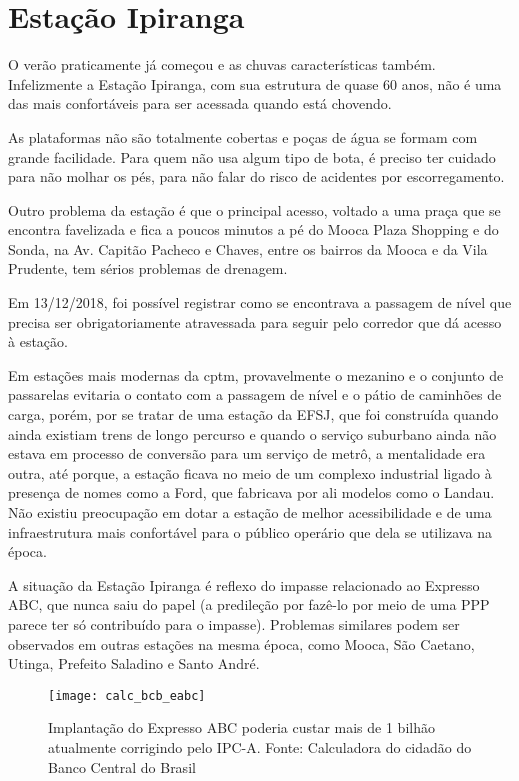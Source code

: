 \documentclass[11pt,fleqn]{book} %
\begin{document}
\section{Estação Ipiranga}\label{s:ipg}


O verão praticamente já começou e as chuvas características também. Infelizmente a Estação Ipiranga, com sua estrutura de quase 60 anos, não é uma das mais confortáveis para ser acessada quando está chovendo.

As plataformas não são totalmente cobertas e poças de água se formam com grande facilidade. Para quem não usa algum tipo de bota, é preciso ter cuidado para não molhar os pés, para não falar do risco de acidentes por escorregamento.

Outro problema da estação é que o principal acesso, voltado a uma praça que se encontra favelizada e fica a poucos minutos a pé do Mooca Plaza Shopping e do Sonda, na Av. Capitão Pacheco e Chaves, entre os bairros da Mooca e da Vila Prudente, tem sérios problemas de drenagem.

Em 13/12/2018, foi possível registrar como se encontrava a passagem de nível que precisa ser obrigatoriamente atravessada para seguir pelo corredor que dá acesso à estação.

Em estações mais modernas da \gls{cptm}, provavelmente o mezanino e o conjunto de passarelas evitaria o contato com a passagem de nível e o pátio de caminhões de carga, porém, por se tratar de uma estação da EFSJ, que foi construída quando ainda existiam trens de longo percurso e quando o serviço suburbano ainda não estava em processo de conversão para um serviço de metrô, a mentalidade era outra, até porque, a estação ficava no meio de um complexo industrial ligado à presença de nomes como a Ford, que fabricava por ali modelos como o Landau. Não existiu preocupação em dotar a estação de melhor acessibilidade e de uma infraestrutura mais confortável para o público operário que dela se utilizava na época.

A situação da Estação Ipiranga é reflexo do impasse relacionado ao Expresso ABC, que nunca saiu do papel (a predileção por fazê-lo por meio de uma PPP parece ter só contribuído para o impasse). Problemas similares podem ser observados em outras estações na mesma época, como Mooca, São Caetano, Utinga, Prefeito Saladino e Santo André.

\begin{figure}[htb]
	\caption[Valor corrigido do Expresso ABC]{Implantação do Expresso ABC poderia custar mais de 1 bilhão atualmente corrigindo pelo IPC-A. Fonte: Calculadora do cidadão do Banco Central do Brasil}
	\centering
	\texttt{[image: calc\_bcb\_eabc]}
	\label{fig:calc_bcb_eabc}
\end{figure}
\end{document}
